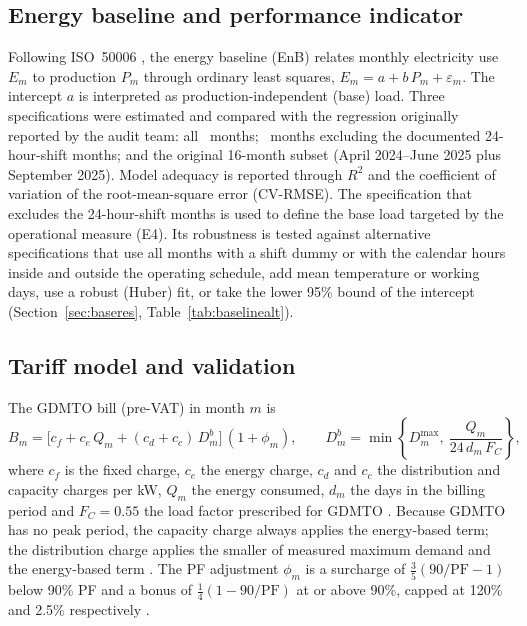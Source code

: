 \documentclass[preprint,12pt,authoryear]{elsarticle}
\begin{document}
\subsection{Energy baseline and performance indicator}
Following ISO~50006 \citep{iso50006}, the energy baseline (EnB) relates monthly electricity use $E_m$ to production $P_m$ through ordinary least squares, $E_m = a + b\,P_m + \varepsilon_m$. The intercept $a$ is interpreted as production-independent (base) load. Three specifications were estimated and compared with the regression originally reported by the audit team: all \nNAll\ months; \nNExcl\ months excluding the documented 24-hour-shift months; and the original 16-month subset (April 2024--June 2025 plus September 2025). Model adequacy is reported through $R^2$ and the coefficient of variation of the root-mean-square error (CV-RMSE). The specification that excludes the 24-hour-shift months is used to define the base load targeted by the operational measure (E4). Its robustness is tested against alternative specifications that use all months with a shift dummy or with the calendar hours inside and outside the operating schedule, add mean temperature or working days, use a robust (Huber) fit, or take the lower 95\% bound of the intercept (Section~\ref{sec:baseres}, Table~\ref{tab:baselinealt}).

\subsection{Tariff model and validation}
The GDMTO bill (pre-VAT) in month $m$ is
\begin{equation}
B_m = \big[c_f + c_e\,Q_m + (c_d + c_c)\,D^{b}_m\big]\,(1+\phi_m), \qquad D^{b}_m = \min\left\{D^{\max}_m,\ \frac{Q_m}{24\,d_m\,F_C}\right\},
\label{eq:bill}
\end{equation}
where $c_f$ is the fixed charge, $c_e$ the energy charge, $c_d$ and $c_c$ the distribution and capacity charges per kW, $Q_m$ the energy consumed, $d_m$ the days in the billing period and $F_C=0.55$ the load factor prescribed for GDMTO \citep{dof2025tariffs}. Because GDMTO has no peak period, the capacity charge always applies the energy-based term; the distribution charge applies the smaller of measured maximum demand and the energy-based term \citep{cfe2026gdmto}. The PF adjustment $\phi_m$ is a surcharge of $\tfrac{3}{5}(90/\mathrm{PF}-1)$ below 90\% PF and a bonus of $\tfrac{1}{4}(1-90/\mathrm{PF})$ at or above 90\%, capped at 120\% and 2.5\% respectively \citep{dof2025tariffs}.
\end{document}
